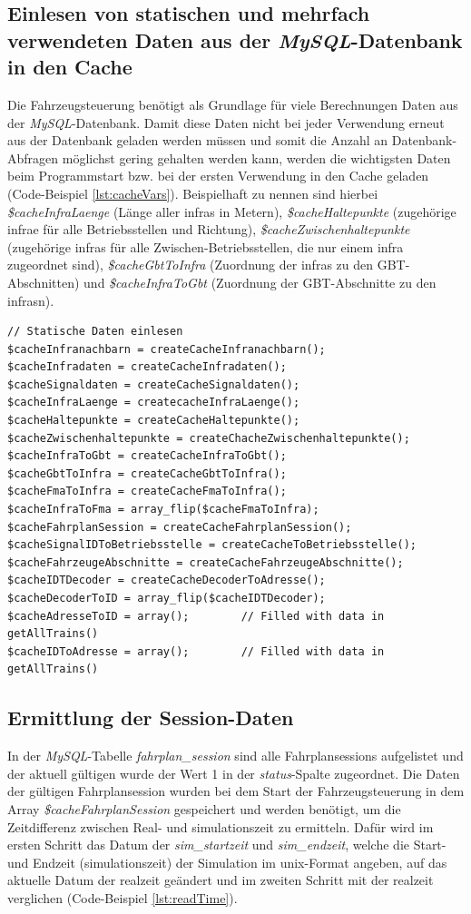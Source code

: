 \subsection{Einlesen von statischen und mehrfach verwendeten Daten aus der \textit{MySQL}-Datenbank in den Cache} \label{main_1}
Die Fahrzeugsteuerung benötigt als Grundlage für viele Berechnungen Daten aus der \textit{MySQL}-Daten\-bank. Damit diese Daten nicht bei jeder Verwendung erneut aus der Datenbank geladen werden müssen und somit die Anzahl an Datenbank-Abfragen möglichst gering gehalten werden kann, werden die wichtigsten Daten beim Programmstart bzw. bei der ersten Verwendung in den Cache geladen (Code-Beispiel \ref{lst:cacheVars}). Beispielhaft zu nennen sind hierbei \textit{\$cache\-Infra\-Laenge} (Länge aller \acp{infra} in Metern), \textit{\$cache\-Haltepunkte} (zugehörige \ac{infra}e für alle Betriebsstellen und Richtung), \textit{\$cacheZwischenhaltepunkte} (zugehörige \acp{infra} für alle Zwischen-Betriebsstellen, die nur einem \ac{infra} zugeordnet sind), \textit{\$cache\-Gbt\-To\-Infra} (Zuordnung der \acp{infra} zu den GBT-Abschnitten) und \textit{\$cache\-Infra\-To\-Gbt} (Zuordnung der GBT-Abschnitte zu  den \acp{infra}n).
\begin{lstlisting}[caption={Initialisierung der Cache Variablen \textit{(fahrzeug\-steu\-e\-rung.php)}},captionpos=b,label={lst:cacheVars}]
// Statische Daten einlesen
$cacheInfranachbarn = createCacheInfranachbarn();
$cacheInfradaten = createCacheInfradaten();
$cacheSignaldaten = createCacheSignaldaten();
$cacheInfraLaenge = createcacheInfraLaenge();
$cacheHaltepunkte = createCacheHaltepunkte();
$cacheZwischenhaltepunkte = createChacheZwischenhaltepunkte();
$cacheInfraToGbt = createCacheInfraToGbt();
$cacheGbtToInfra = createCacheGbtToInfra();
$cacheFmaToInfra = createCacheFmaToInfra();
$cacheInfraToFma = array_flip($cacheFmaToInfra);
$cacheFahrplanSession = createCacheFahrplanSession();
$cacheSignalIDToBetriebsstelle = createCacheToBetriebsstelle();
$cacheFahrzeugeAbschnitte = createCacheFahrzeugeAbschnitte();
$cacheIDTDecoder = createCacheDecoderToAdresse();
$cacheDecoderToID = array_flip($cacheIDTDecoder);
$cacheAdresseToID = array();		// Filled with data in getAllTrains()
$cacheIDToAdresse = array();		// Filled with data in getAllTrains()
\end{lstlisting}
\subsection{Ermittlung der Session-Daten} \label{main_12}
In der \textit{MySQL}-Tabelle \textit{fahrplan\_session} sind alle Fahrplansessions aufgelistet und der aktuell gültigen wurde der Wert 1 in der \textit{status}-Spalte zugeordnet. Die Daten der gültigen Fahrplansession wurden bei dem Start der Fahrzeugsteuerung in dem Array \textit{\$cacheFahrplanSession} gespeichert und werden benötigt, um die Zeitdifferenz zwischen Real- und \Gls{simulationszeit} zu ermitteln. Dafür wird im ersten Schritt das Datum der \textit{sim\_startzeit} und \textit{sim\_endzeit}, welche die Start- und Endzeit (\Gls{simulationszeit}) der Simulation im \Gls{unix}-Format angeben, auf das aktuelle Datum der \Gls{realzeit} geändert und im zweiten Schritt mit der \Gls{realzeit} verglichen (Code-Beispiel \ref{lst:readTime}).

